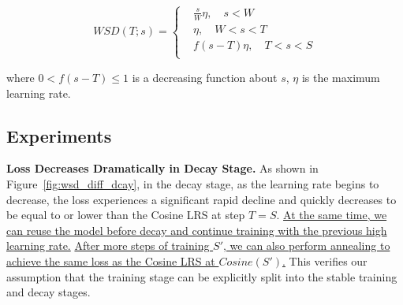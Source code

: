 \vspace{-2mm}
\begin{equation}
    WSD(T; s) = \begin{cases}
       & \frac{s}{W} \eta, \quad s<W\\
       & \eta, \quad W < s < T \\
       & f(s-T)\eta,\quad T < s < S\\
    \end{cases}
\end{equation}

where $0< f(s-T)\leq 1$ is a decreasing function about $s$, $\eta$ is the maximum learning rate.

\subsection{Experiments}
\label{sec:wsd_experiments_continoustrain}

\textbf{Loss Decreases Dramatically in Decay Stage. } As shown in Figure~\ref{fig:wsd_diff_dcay}, in the decay stage, as the learning rate begins to decrease, the loss experiences a significant rapid decline and quickly decreases to be equal to or lower than the Cosine LRS at step $T=S$. \uline{At the same time, we can reuse the model before decay and continue training with the previous high learning rate.} \uline{After more steps of training $S'$, we can also perform annealing to achieve the same loss as the Cosine LRS at $Cosine(S')$.} This verifies our assumption that the training stage can be explicitly split into the stable training and decay stages.


